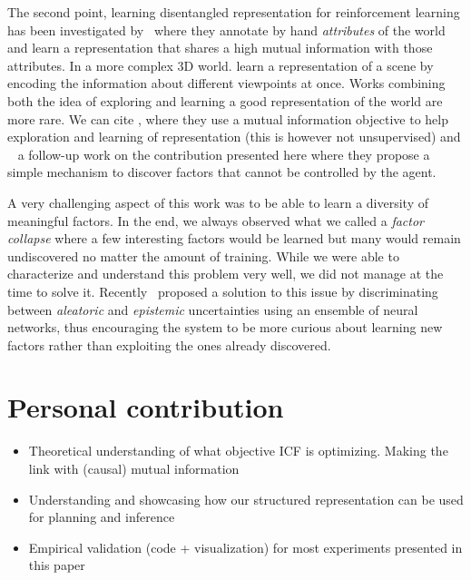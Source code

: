 The second point, learning disentangled representation for reinforcement learning has been investigated by~\citet{anand2019unsupervised} where they annotate by hand \emph{attributes} of the world and learn a representation that shares a high mutual information with those attributes. In a more complex 3D world. \citet{eslami2018neural} learn a representation of a scene by encoding the information about different viewpoints at once. Works combining both the idea of exploring and learning a good representation of the world are more rare. We can cite \citet{kim2019emi}, where they use a mutual information objective to help exploration and learning of representation (this is however not unsupervised) and ~\citet{li2018disentangled} a follow-up work on the contribution presented here where they propose a simple mechanism to discover factors that cannot be controlled by the agent.

A very challenging aspect of this work was to be able to learn a diversity of meaningful factors. In the end, we always observed what we called a \emph{factor collapse} where a few interesting factors would be learned but many would remain undiscovered no matter the amount of training. While we were able to characterize and understand this problem very well, we did not manage at the time to solve it. Recently~\citet{strouse2021learning} proposed a solution to this issue by discriminating between \emph{aleatoric} and \emph{epistemic} uncertainties using an ensemble of neural networks, thus encouraging the system to be more curious about learning new factors rather than exploiting the ones already discovered.

\section*{Personal contribution}
\begin{itemize}
    \item Theoretical understanding of what objective ICF is optimizing. Making the link with (causal) mutual information
    \item Understanding and showcasing how our structured representation can be used for planning and inference
    \item Empirical validation (code + visualization) for most experiments presented in this paper
\end{itemize}

\newpage


